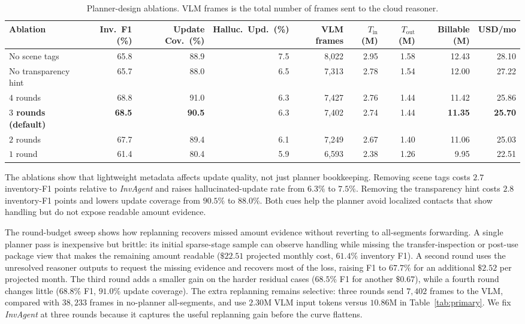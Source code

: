 \documentclass[sigconf,anonymous,nonacm]{acmart}
\newcommand{\sys}{\textit{InvAgent}\xspace}
\begin{document}
\begin{table}[t]
\centering
\small
\setlength{\tabcolsep}{4pt}
\caption{Planner-design ablations. VLM frames is the total number of
frames sent to the cloud reasoner.}
\label{tab:ablation-deltas}
\begin{tabular}{lrrrrrrrr}
\toprule
Ablation & Inv.~F1 (\%) & Update Cov.~(\%) & Halluc.~Upd.~(\%) & VLM frames & $T_{\mathrm{in}}$ (M) & $T_{\mathrm{out}}$ (M) & Billable (M) & USD/mo \\
\midrule
No scene tags          & 65.8 & 88.9 & 7.5 & 8,022 & 2.95 & 1.58 & 12.43 & 28.10 \\
No transparency hint   & 65.7 & 88.0 & 6.5 & 7,313 & 2.78 & 1.54 & 12.00 & 27.22 \\
$4$ rounds             & 68.8 & 91.0 & 6.3 & 7,427 & 2.76 & 1.44 & 11.42 & 25.86 \\
\textbf{$3$ rounds (default)} & \textbf{68.5} & \textbf{90.5} & 6.3 & 7,402 & 2.74 & 1.44 & \textbf{11.35} & \textbf{25.70} \\
$2$ rounds             & 67.7 & 89.4 & 6.1 & 7,249 & 2.67 & 1.40 & 11.06 & 25.03 \\
$1$ round              & 61.4 & 80.4 & 5.9 & 6,593 & 2.38 & 1.26 &  9.95 & 22.51 \\
\bottomrule
\end{tabular}
\end{table}

The ablations show that lightweight metadata affects update quality,
not just planner bookkeeping. Removing scene tags costs $2.7$
inventory-F1 points relative to \sys and raises hallucinated-update
rate from $6.3\%$ to $7.5\%$. Removing the transparency hint costs
$2.8$ inventory-F1 points and lowers update coverage from $90.5\%$ to
$88.0\%$. Both cues help the planner avoid localized contacts that show
handling but do not expose readable amount evidence.

The round-budget sweep shows how replanning recovers missed amount
evidence without reverting to all-segments forwarding. A single planner
pass is inexpensive but brittle: its initial sparse-stage sample can
observe handling while missing the transfer-inspection or post-use
package view that makes the remaining amount readable ($\$22.51$
projected monthly cost, $61.4\%$ inventory F1). A second round uses the
unresolved reasoner outputs to request the missing evidence and recovers
most of the loss, raising F1 to $67.7\%$ for an additional $\$2.52$ per
projected month.
The third round adds a smaller gain on the harder residual cases
($68.5\%$ F1 for another $\$0.67$), while a fourth round changes little
($68.8\%$ F1, $91.0\%$ update coverage). The extra replanning remains
selective: three rounds send $7{,}402$ frames to the VLM, compared with
$38{,}233$ frames in no-planner all-segments, and use $2.30$M VLM input
tokens versus $10.86$M in Table~\ref{tab:primary}. We fix \sys at
three rounds because it captures the useful replanning gain before the
curve flattens.
\end{document}
